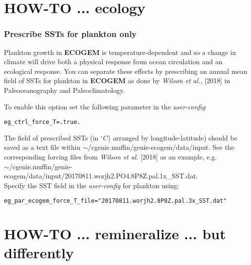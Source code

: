 \section{HOW-TO ...  ecology}

%
\subsubsection{Prescribe SSTs for plankton only}
\vspace{1mm}

Plankton growth in \textbf{ECOGEM} is temperature-dependent and so a change in climate will drive both a physical response from ocean circulation and an ecological response. You can separate these effects by prescribing an annual mean field of SSTs for plankton in \textbf{ECOGEM} as done by \textit{Wilson et al.,} [2018] in Paleoceanography and Paleoclimatology. 

To enable this option set the following parameter in the \textit{user-config}:
\vspace{-1mm}\begin{verbatim}
eg_ctrl_force_T=.true.
\end{verbatim}\vspace{-1mm}
The field of prescribed SSTs (in \(^{\circ} C\)) arranged by longitude-latitude) should be saved as a text file within \textsf{\footnotesize \(\sim\)/cgenie.muffin/genie-ecogem/data/input}. See the corresponding forcing files from \textit{Wilson et al.} [2018] as an example, e.g.
\vspace{1mm}
\\\textsf{\footnotesize \(\sim\)/cgenie.muffin/genie-ecogem/data/input/20170811.worjh2.PO4.8P8Z.pal.1x\_SST.dat}.
\vspace{1mm}
\\Specify the SST field in the \textit{user-config} for plankton using:
\vspace{-2mm}\begin{verbatim}
eg_par_ecogem_force_T_file="20170811.worjh2.8P8Z.pal.3x_SST.dat"
\end{verbatim}\vspace{-1mm}


\newpage


\section{HOW-TO ... remineralize ... but differently}

